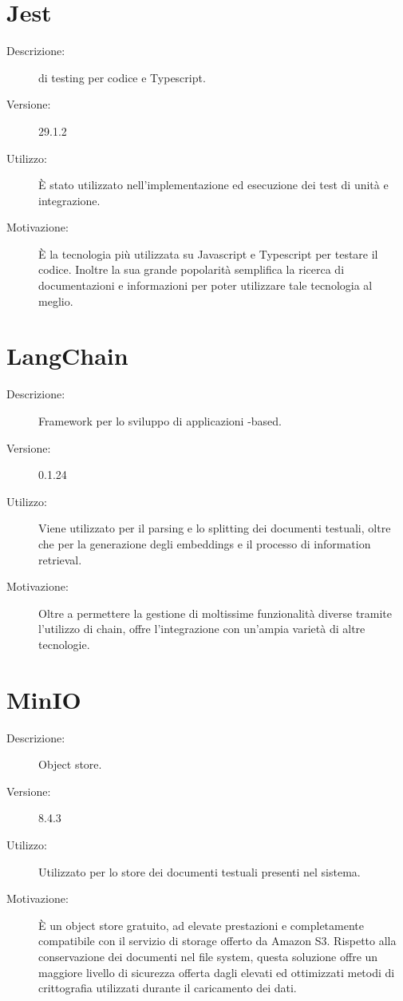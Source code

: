 \section{Jest}
\begin{description}
\item[Descrizione:]  di testing per codice  e Typescript.
\item[Versione:] 29.1.2
\item[Utilizzo:] È stato utilizzato nell'implementazione ed esecuzione dei test di unità e integrazione.
\item[Motivazione:] È la tecnologia più utilizzata su Javascript e Typescript per testare il codice. Inoltre la sua grande popolarità semplifica la ricerca di documentazioni e informazioni per poter utilizzare tale tecnologia al meglio.
\end{description}

\section{LangChain}
\begin{description}
\item[Descrizione:] Framework per lo sviluppo di applicazioni -based.
\item[Versione:] 0.1.24
\item[Utilizzo:] Viene utilizzato per il parsing e lo splitting dei documenti testuali, oltre che per la generazione degli embeddings e il processo di information retrieval. 
\item[Motivazione:] Oltre a permettere la gestione di moltissime funzionalità diverse tramite l'utilizzo di chain, offre l'integrazione con un'ampia varietà di altre tecnologie. 
\end{description}

\section{MinIO}
\begin{description}
\item[Descrizione:] Object store.
\item[Versione:] 8.4.3
\item[Utilizzo:] Utilizzato per lo store dei documenti testuali presenti nel sistema.
\item[Motivazione:] È un object store gratuito, ad elevate prestazioni e completamente compatibile con il servizio di storage offerto da Amazon S3. Rispetto alla conservazione dei documenti nel file system, questa soluzione offre un maggiore livello di sicurezza offerta dagli elevati ed ottimizzati metodi di crittografia utilizzati durante il caricamento dei dati.
\end{description}

